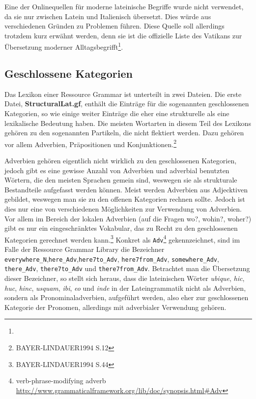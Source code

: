 \documentclass[12pt,abstract=on,titlepage,bibliography=totoc,ngerman,listof=totoc]{scrreprt}
\begin{document}
Eine der Onlinequellen für moderne lateinische Begriffe wurde nicht verwendet, da sie nur zwischen Latein und Italienisch übersetzt. Dies würde aus verschiedenen Gründen zu Problemen führen. Diese Quelle soll allerdings trotzdem kurz erwähnt werden, denn sie ist die offizielle Liste des Vatikans zur Übersetzung moderner Alltagsbegrifft\footnote{\vatlatinitas}.
\subsection{Geschlossene Kategorien}
\label{subsec:geschlossene}
Das Lexikon einer Ressource Grammar ist unterteilt in zwei Dateien. Die erste Datei, \textbf{StructuralLat.gf}, enthält die Einträge für die sogenannten geschlossenen Kategorien, so wie einige weiter Einträge die eher eine strukturelle als eine lexikalische Bedeutung haben. Die meisten Wortarten in diesem Teil des Lexikons gehören zu den sogenannten Partikeln, die nicht flektiert werden. Dazu gehören vor allem Adverbien, Präpositionen und Konjunktionen.\footnote{BAYER-LINDAUER1994 S.12} \par
Adverbien gehören eigentlich nicht wirklich zu den geschlossenen Kategorien, jedoch gibt es eine gewisse Anzahl von Adverbien und adverbial benutzten Wörtern, die den meisten Sprachen gemein sind, weswegen sie als strukturale Bestandteile aufgefasst werden können. Meist werden Adverbien aus Adjecktiven gebildet, weswegen man sie zu den offenen Kategorien rechnen sollte. Jedoch ist dies nur eine von verschiedenen Möglichkeiten zur Verwendung von Adverbien. Vor allem im  Bereich der lokalen Adverbien (auf die Fragen wo?, wohin?, woher?) gibt es nur ein eingeschränktes Vokabular, das zu Recht zu den geschlossenen Kategorien gerechnet werden kann.\footnote{BAYER-LINDAUER1994 S.44} 
Konkret als \texttt{Adv}\footnote{verb-phrase-modifying adverb \url{http://www.grammaticalframework.org/lib/doc/synopsis.html#Adv}} gekennzeichnet, sind im Falle der Ressource Grammar Library die Bezeichner \texttt{everywhere\_N},\texttt{here\_Adv},\texttt{here7to\_Adv}, \texttt{here7from\_Adv}, \texttt{somewhere\_Adv}, \texttt{there\_Adv}, \texttt{there7to\_Adv} und \texttt{there7from\_Adv}. Betrachtet man die Übersetzung dieser Bezeichner, so stellt sich heraus, dass die lateinischen Wörter \textit{ubique}, \textit{hic}, \textit{huc}, \textit{hinc}, \textit{usquam}, \textit{ibi}, \textit{eo} und \textit{inde} in der Lateingrammatik nicht als Adverbien, sondern als Pronominaladverbien, aufgeführt werden, also eher zur geschlossenen Kategorie der Pronomen, allerdings mit adverbialer Verwendung gehören. \par
\end{document}
